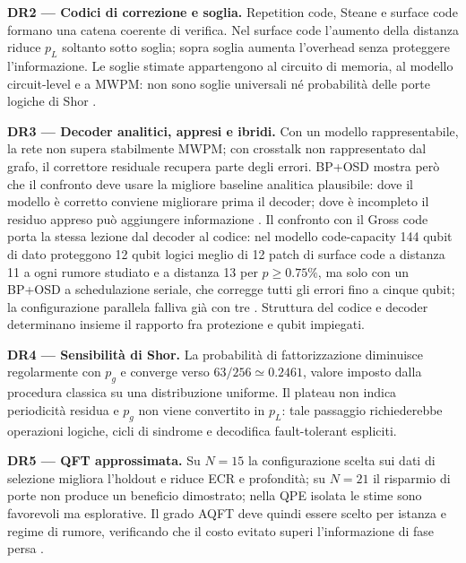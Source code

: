 \label{sec:finale_6_1_2}
\textbf{DR2 --- Codici di correzione e soglia.}
Repetition code, Steane e surface code formano una catena coerente di verifica. Nel surface code l'aumento della distanza riduce $p_L$ soltanto sotto soglia; sopra soglia aumenta l'overhead senza proteggere l'informazione. Le soglie stimate appartengono al circuito di memoria, al modello circuit-level e a MWPM: non sono soglie universali né probabilità delle porte logiche di Shor \cite{steane1996,fowler2012,googleQECBelowThreshold2025,dennis2002topological}.

\label{sec:finale_6_1_3}
\textbf{DR3 --- Decoder analitici, appresi e ibridi.}
Con un modello rappresentabile, la rete non supera stabilmente MWPM; con crosstalk non rappresentato dal grafo, il correttore residuale recupera parte degli errori. BP+OSD mostra però che il confronto deve usare la migliore baseline analitica plausibile: dove il modello è corretto conviene migliorare prima il decoder; dove è incompleto il residuo appreso può aggiungere informazione \cite{roffe2020,panteleev2021,alphaqubit2024}. Il confronto con il Gross code porta la stessa lezione dal decoder al codice: nel modello code-capacity 144 qubit di dato proteggono 12 qubit logici meglio di 12 patch di surface code a distanza 11 a ogni rumore studiato e a distanza 13 per $p \ge 0.75\%$, ma solo con un BP+OSD a schedulazione seriale, che corregge tutti gli errori fino a cinque qubit; la configurazione parallela falliva già con tre \cite{bravyi2024}. Struttura del codice e decoder determinano insieme il rapporto fra protezione e qubit impiegati.

\label{sec:finale_6_1_4}
\textbf{DR4 --- Sensibilità di Shor.}
La probabilità di fattorizzazione diminuisce regolarmente con $p_g$ e converge verso $63/256\simeq0.2461$, valore imposto dalla procedura classica su una distribuzione uniforme. Il plateau non indica periodicità residua e $p_g$ non viene convertito in $p_L$: tale passaggio richiederebbe operazioni logiche, cicli di sindrome e decodifica fault-tolerant espliciti.

\label{sec:finale_6_1_5}
\textbf{DR5 --- QFT approssimata.}
Su $N=15$ la configurazione scelta sui dati di selezione migliora l'holdout e riduce ECR e profondità; su $N=21$ il risparmio di porte non produce un beneficio dimostrato; nella QPE isolata le stime sono favorevoli ma esplorative. Il grado AQFT deve quindi essere scelto per istanza e regime di rumore, verificando che il costo evitato superi l'informazione di fase persa \cite{barencoAQFT1996,akoramurthy2026}.

